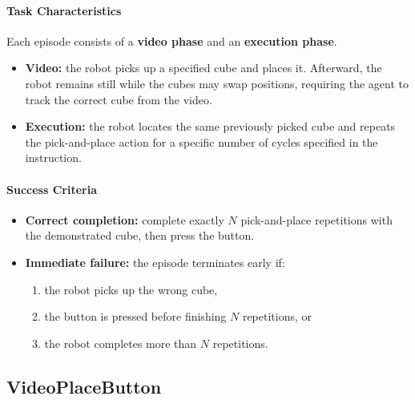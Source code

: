 \paragraph{Task Characteristics}
Each episode consists of a \textbf{video phase} and an \textbf{execution phase}.
\begin{itemize}[itemsep=1pt, topsep=0pt, leftmargin=*]
\item \textbf{Video:} the robot picks up a specified cube and places it. Afterward, the robot remains still while the cubes may swap positions, requiring the agent to track the correct cube from the video.
\item \textbf{Execution:} the robot locates the same previously picked cube and repeats the pick-and-place action for a specific number of cycles specified in the instruction.
\end{itemize}

\paragraph{Success Criteria}
\begin{itemize}[itemsep=1pt, topsep=0pt, leftmargin=*]
\item \textbf{Correct completion:} complete exactly $N$ pick-and-place repetitions with the demonstrated cube, then press the button.
\item \textbf{Immediate failure:} the episode terminates early if:
\begin{enumerate}[itemsep=1pt, topsep=0pt, leftmargin=*]
\item the robot picks up the wrong cube,
\item the button is pressed before finishing $N$ repetitions, or
\item the robot completes more than $N$ repetitions.
\end{enumerate}
\end{itemize}

\clearpage


\subsection{VideoPlaceButton}
\label{sec:task_videoplacebutton}

\begin{table}
    \centering
    \caption{\textit{VideoPlaceButton} Task Configuration.}
    \label{tab:videoplacebutton_difficulty_config}
    \renewcommand{\arraystretch}{1.2}
    {}
\end{table}

